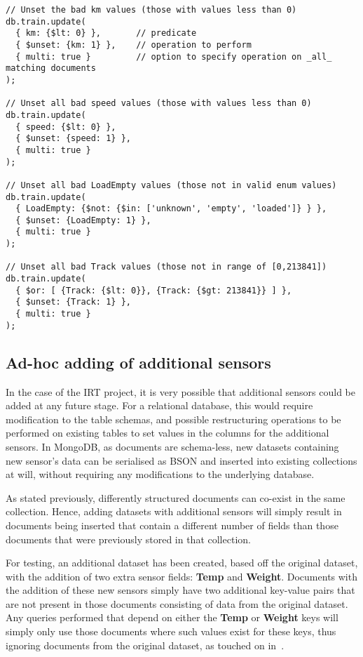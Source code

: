 \documentclass[a4paper,11pt]{article}
\begin{document}
\begin{lstlisting}[caption=MongoDB \texttt{update()} functions to remove data deemed to be noisy from existing documents.]
// Unset the bad km values (those with values less than 0)
db.train.update(
  { km: {$lt: 0} },       // predicate
  { $unset: {km: 1} },    // operation to perform
  { multi: true }         // option to specify operation on _all_ matching documents
);

// Unset all bad speed values (those with values less than 0)
db.train.update(
  { speed: {$lt: 0} },
  { $unset: {speed: 1} },
  { multi: true }
);

// Unset all bad LoadEmpty values (those not in valid enum values)
db.train.update(
  { LoadEmpty: {$not: {$in: ['unknown', 'empty', 'loaded']} } },
  { $unset: {LoadEmpty: 1} },
  { multi: true }
);

// Unset all bad Track values (those not in range of [0,213841])
db.train.update(
  { $or: [ {Track: {$lt: 0}}, {Track: {$gt: 213841}} ] },
  { $unset: {Track: 1} },
  { multi: true }
);
\end{lstlisting}



\subsection{Ad-hoc adding of additional sensors} %
\label{sub:adding_additional_sensors}

In the case of the IRT project, it is very possible that additional sensors could be added at any future stage. For a
relational database, this would require modification to the table schemas, and possible restructuring operations
to be performed on existing tables to set values in the columns for the additional sensors. In MongoDB, as documents are
schema-less, new datasets containing new sensor's data can be serialised as BSON and inserted into existing collections
at will, without requiring any modifications to the underlying database.

As stated previously, differently structured documents can co-exist in the same collection. Hence, adding datasets
with additional sensors will simply result in documents being inserted that contain a different number of fields than
those documents that were previously stored in that collection.

For testing, an additional dataset has been created, based off the original dataset, with the addition of two extra
sensor fields: \textbf{Temp} and \textbf{Weight}. Documents with the addition of these new sensors simply have two
additional key-value pairs that are not present in those documents consisting of data from the original dataset. Any
queries performed that depend on either the \textbf{Temp} or \textbf{Weight} keys will simply only use those documents
where such values exist for these keys, thus ignoring documents from the original dataset, as touched on in~.
\end{document}
